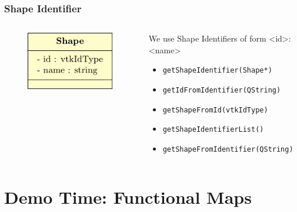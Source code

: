 \documentclass[compress]{beamer}
\begin{document}
\begin{frame}
	\frametitle{Shape Identifier}
	
	\begin{columns}
    		\begin{column}{.3\linewidth}
      		\begin{figure}[h]
				\centering
				\includegraphics[width=\textwidth]{diagramshape.pdf}
			\end{figure}
   		\end{column}
    		\begin{column}{.7\linewidth}
		
			 We use Shape Identifiers of form <id>:<name> 
			 
			 \begin{itemize}
			 	\item<2> \texttt{getShapeIdentifier(Shape*)}
				\item<2> \texttt{getIdFromIdentifier(QString)}
				\item<2> \texttt{getShapeFromId(vtkIdType)}
				\item<2> \texttt{getShapeIdentifierList()}
				\item<2> \texttt{getShapeFromIdentifier(QString)}
			 \end{itemize}
      
    		\end{column}
  	\end{columns}
	
\end{frame}

\section{Demo Time: Functional Maps}
\end{document}
